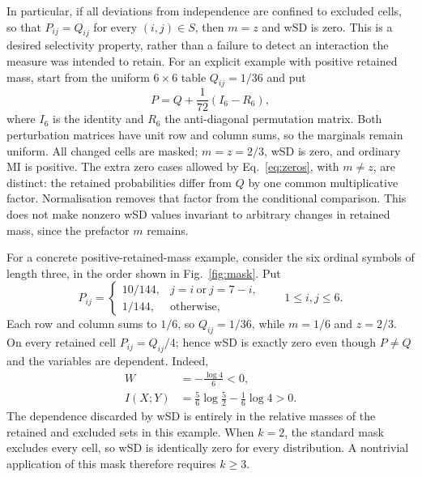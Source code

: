 In particular, if all deviations from independence are confined to excluded cells, so that $P_{ij}=Q_{ij}$ for every $(i,j)\in S$, then $m=z$ and wSD is zero. This is a desired selectivity property, rather than a failure to detect an interaction the measure was intended to retain. For an explicit example with positive retained mass, start from the uniform $6\times6$ table $Q_{ij}=1/36$ and put
\begin{equation}
P=Q+\frac{1}{72}(I_6-R_6),
\end{equation}
where $I_6$ is the identity and $R_6$ the anti-diagonal permutation matrix. Both perturbation matrices have unit row and column sums, so the marginals remain uniform. All changed cells are masked; $m=z=2/3$, wSD is zero, and ordinary MI is positive. The extra zero cases allowed by Eq.~\eqref{eq:zeros}, with $m\ne z$, are distinct: the retained probabilities differ from $Q$ by one common multiplicative factor. Normalisation removes that factor from the conditional comparison. This does not make nonzero wSD values invariant to arbitrary changes in retained mass, since the prefactor $m$ remains.

For a concrete positive-retained-mass example, consider the six ordinal symbols of length three, in the order shown in Fig.~\ref{fig:mask}. Put
\begin{equation}
P_{ij}=\begin{cases}
10/144,&j=i\ \text{or}\ j=7-i,\\
1/144,&\text{otherwise},
\end{cases}\qquad 1\leq i,j\leq6.
\label{eq:zeroexample}
\end{equation}
Each row and column sums to $1/6$, so $Q_{ij}=1/36$, while $m=1/6$ and $z=2/3$. On every retained cell $P_{ij}=Q_{ij}/4$; hence wSD is exactly zero even though $P\ne Q$ and the variables are dependent. Indeed,
\begin{align*}
W&=-\frac{\log4}{6}<0,\\
I(X;Y)&=\frac56\log\frac52-\frac16\log4>0.
\end{align*}
The dependence discarded by wSD is entirely in the relative masses of the retained and excluded sets in this example. When $k=2$, the standard mask excludes every cell, so wSD is identically zero for every distribution. A nontrivial application of this mask therefore requires $k\geq3$.

